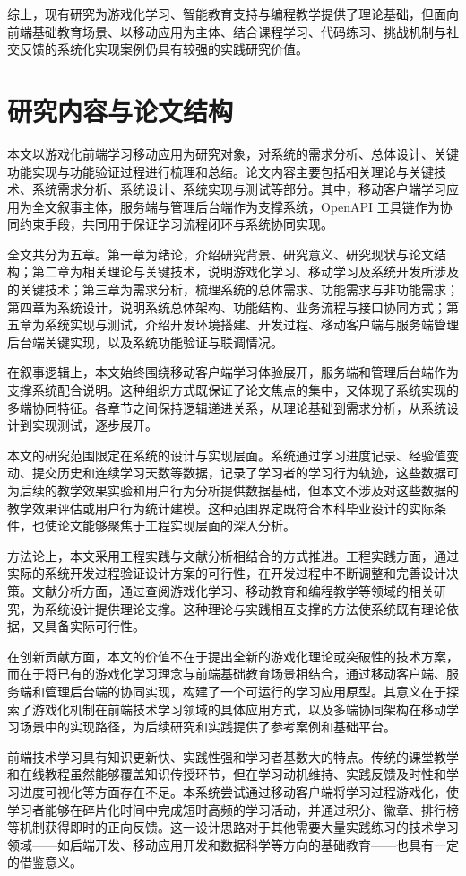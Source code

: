 综上，现有研究为游戏化学习、智能教育支持与编程教学提供了理论基础，但面向前端基础教育场景、以移动应用为主体、结合课程学习、代码练习、挑战机制与社交反馈的系统化实现案例仍具有较强的实践研究价值。

\section{研究内容与论文结构}

本文以游戏化前端学习移动应用为研究对象，对系统的需求分析、总体设计、关键功能实现与功能验证过程进行梳理和总结。论文内容主要包括相关理论与关键技术、系统需求分析、系统设计、系统实现与测试等部分。其中，移动客户端学习应用为全文叙事主体，服务端与管理后台端作为支撑系统，OpenAPI 工具链作为协同约束手段，共同用于保证学习流程闭环与系统协同实现。

全文共分为五章。第一章为绪论，介绍研究背景、研究意义、研究现状与论文结构；第二章为相关理论与关键技术，说明游戏化学习、移动学习及系统开发所涉及的关键技术；第三章为需求分析，梳理系统的总体需求、功能需求与非功能需求；第四章为系统设计，说明系统总体架构、功能结构、业务流程与接口协同方式；第五章为系统实现与测试，介绍开发环境搭建、开发过程、移动客户端与服务端管理后台端关键实现，以及系统功能验证与联调情况。

在叙事逻辑上，本文始终围绕移动客户端学习体验展开，服务端和管理后台端作为支撑系统配合说明。这种组织方式既保证了论文焦点的集中，又体现了系统实现的多端协同特征。各章节之间保持逻辑递进关系，从理论基础到需求分析，从系统设计到实现测试，逐步展开。

本文的研究范围限定在系统的设计与实现层面。系统通过学习进度记录、经验值变动、提交历史和连续学习天数等数据，记录了学习者的学习行为轨迹，这些数据可为后续的教学效果实验和用户行为分析提供数据基础，但本文不涉及对这些数据的教学效果评估或用户行为统计建模。这种范围界定既符合本科毕业设计的实际条件，也使论文能够聚焦于工程实现层面的深入分析。

方法论上，本文采用工程实践与文献分析相结合的方式推进。工程实践方面，通过实际的系统开发过程验证设计方案的可行性，在开发过程中不断调整和完善设计决策。文献分析方面，通过查阅游戏化学习、移动教育和编程教学等领域的相关研究，为系统设计提供理论支撑。这种理论与实践相互支撑的方法使系统既有理论依据，又具备实际可行性。

在创新贡献方面，本文的价值不在于提出全新的游戏化理论或突破性的技术方案，而在于将已有的游戏化学习理念与前端基础教育场景相结合，通过移动客户端、服务端和管理后台端的协同实现，构建了一个可运行的学习应用原型。其意义在于探索了游戏化机制在前端技术学习领域的具体应用方式，以及多端协同架构在移动学习场景中的实现路径，为后续研究和实践提供了参考案例和基础平台。

前端技术学习具有知识更新快、实践性强和学习者基数大的特点。传统的课堂教学和在线教程虽然能够覆盖知识传授环节，但在学习动机维持、实践反馈及时性和学习进度可视化等方面存在不足。本系统尝试通过移动客户端将学习过程游戏化，使学习者能够在碎片化时间中完成短时高频的学习活动，并通过积分、徽章、排行榜等机制获得即时的正向反馈。这一设计思路对于其他需要大量实践练习的技术学习领域——如后端开发、移动应用开发和数据科学等方向的基础教育——也具有一定的借鉴意义。
